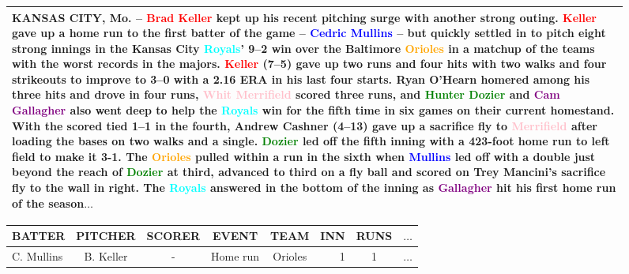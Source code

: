 \documentclass[11pt,a4paper]{article}
\newcommand{\lform}[1]{\textsf{\scriptsize{#1}}}
\begin{document}
\begin{figure*}
\begin{small}
\begin{minipage}{0.5\textwidth}
\begin{tabular}{p{9cm}}
                  {\footnotesize
                  KANSAS CITY, Mo. -- \textcolor{red}{\textbf{Brad Keller}} kept up his recent pitching surge with another strong outing.
                  \textcolor{red}{\textbf{Keller}} gave up a home run to the first batter of the game -- \textcolor{blue}{\textbf{Cedric Mullins}} -- but quickly settled in to pitch eight strong innings in the Kansas City \textcolor{cyan}{\textbf{Royals}}' 9--2 win over the Baltimore \textcolor{orange}{\textbf{Orioles}} in a matchup of the teams with the worst records in the majors.
                  \textcolor{red}{\textbf{Keller}} (7--5) gave up two runs and four hits with two walks and four strikeouts to improve to 3--0 with a 2.16 ERA in his last four starts.
                  \textbf{Ryan O'Hearn} homered among his three hits and drove in four runs, \textcolor{pink}{\textbf{Whit Merrifield}} scored three runs, and \textcolor{green}{Hunter Dozier} and \textcolor{purple}{\textbf{Cam Gallagher}} also went deep to help the \textcolor{cyan}{\textbf{Royals}} win for the fifth time in six games on their current homestand.
                  With the scored tied 1--1 in the fourth, \textbf{Andrew Cashner} (4--13) gave up a sacrifice fly to \textcolor{pink}{\textbf{Merrifield}} after loading the bases on two walks and a single. \textcolor{green}{\textbf{Dozier}} led off the fifth inning with a 423-foot home run to left field to make it 3-1.
                  The \textcolor{orange}{\textbf{Orioles}} pulled within a run in the sixth when
                  \textcolor{blue}{\textbf{Mullins}} led off with a double just beyond the reach of \textcolor{green}{\textbf{Dozier}} at third, advanced to third on a fly ball and scored on \textbf{Trey Mancini}'s sacrifice fly to the wall in right.
                  The \textcolor{cyan}{\textbf{Royals}} answered in the bottom of the inning as \textcolor{purple}{\textbf{Gallagher}} hit his
                  first home run of the season\lform{$\dots$}
}
\\
\hline \end{tabular}
\end{minipage}
\begin{minipage}{\textwidth}
\vspace{.2cm}
\hspace*{4cm}\begin{tabular}{@{}l@{~~}c@{~~}c@{~~}c@{~~}cr@{~~}c@{~~}l@{}} \hline
\lform{BATTER}&\lform{PITCHER}&\lform{SCORER}&\lform{EVENT}&\lform{TEAM} & \lform{INN} & \lform{RUNS} & \lform{$\dots$}\\ \hline
\lform{C. Mullins}&\lform{B. Keller}&\lform{-}&\lform{Home run}&\lform{Orioles} & \lform{1} &  \lform{1} & \lform{$\dots$}\\ 

\end{tabular}
\end{minipage}
\end{small}
\end{figure*}
\end{document}
